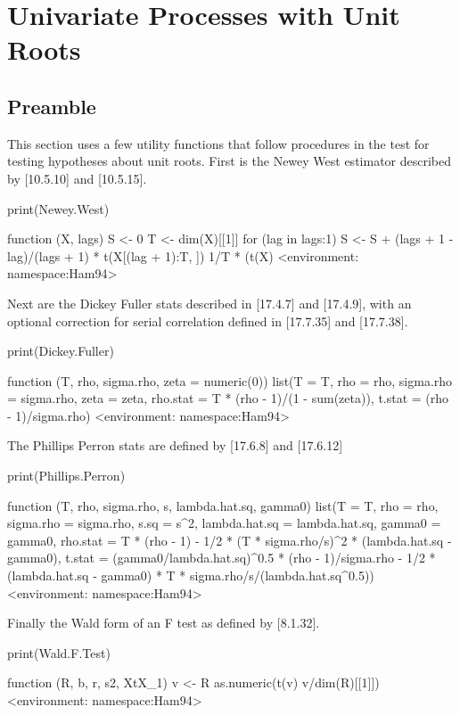 \documentclass[a4paper]{article}
\renewcommand{\~}{\perispomeni}%
\begin{document}
\section{Univariate Processes with Unit Roots}
\subsection{Preamble}
This section uses a few utility functions that follow procedures in the test for testing hypotheses about unit roots.
First is the Newey West estimator described by [10.5.10] and [10.5.15].
\begin{Schunk}
\begin{Sinput}
 print(Newey.West)
\end{Sinput}
\begin{Soutput}
function (X, lags) 
{
    S <- 0
    T <- dim(X)[[1]]
    for (lag in lags:1) S <- S + (lags + 1 - lag)/(lags + 1) * 
        t(X[(lag + 1):T, ]) %
    1/T * (t(X) %
}
<environment: namespace:Ham94>
\end{Soutput}
\end{Schunk}
Next are the Dickey Fuller stats described in [17.4.7] and [17.4.9], with an optional correction for
serial correlation defined in [17.7.35] and [17.7.38].
\begin{Schunk}
\begin{Sinput}
 print(Dickey.Fuller)
\end{Sinput}
\begin{Soutput}
function (T, rho, sigma.rho, zeta = numeric(0)) 
{
    list(T = T, rho = rho, sigma.rho = sigma.rho, zeta = zeta, 
        rho.stat = T * (rho - 1)/(1 - sum(zeta)), t.stat = (rho - 
            1)/sigma.rho)
}
<environment: namespace:Ham94>
\end{Soutput}
\end{Schunk}
The Phillips Perron stats are defined by [17.6.8] and [17.6.12]
\begin{Schunk}
\begin{Sinput}
 print(Phillips.Perron)
\end{Sinput}
\begin{Soutput}
function (T, rho, sigma.rho, s, lambda.hat.sq, gamma0) 
{
    list(T = T, rho = rho, sigma.rho = sigma.rho, s.sq = s^2, 
        lambda.hat.sq = lambda.hat.sq, gamma0 = gamma0, rho.stat = T * 
            (rho - 1) - 1/2 * (T * sigma.rho/s)^2 * (lambda.hat.sq - 
            gamma0), t.stat = (gamma0/lambda.hat.sq)^0.5 * (rho - 
            1)/sigma.rho - 1/2 * (lambda.hat.sq - gamma0) * T * 
            sigma.rho/s/(lambda.hat.sq^0.5))
}
<environment: namespace:Ham94>
\end{Soutput}
\end{Schunk}
Finally the Wald form of an F test as defined by [8.1.32].
\begin{Schunk}
\begin{Sinput}
 print(Wald.F.Test)
\end{Sinput}
\begin{Soutput}
function (R, b, r, s2, XtX_1) 
{
    v <- R %
    as.numeric(t(v) %
        v/dim(R)[[1]])
}
<environment: namespace:Ham94>
\end{Soutput}
\end{Schunk}
\end{document}
